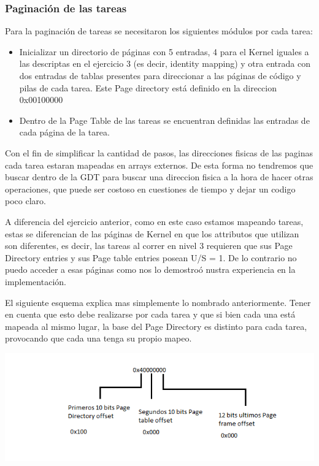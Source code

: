 \subsubsection{Paginaci\'on de las tareas}

Para la paginaci\'on de tareas se necesitaron los siguientes m\'odulos por cada tarea:
\begin{itemize}
 \item Inicializar un directorio de p\'aginas con 5 entradas, 4 para el Kernel iguales a las descriptas en el ejercicio 3 (es decir, identity mapping) 
 y otra entrada con dos entradas de tablas presentes para direccionar a las p\'aginas de c\'odigo y pilas de cada tarea. Este Page directory est\'a definido en la direccion 0x00100000
 \item Dentro de la Page Table de las tareas se encuentran definidas las entradas de cada p\'agina de la tarea. 
\end{itemize}

Con el fin de simplificar la cantidad de pasos, las direcciones fisicas de las paginas cada tarea estaran mapeadas en arrays externos. De esta forma no
tendremos que buscar dentro de la GDT para buscar una direccion fisica a la hora de hacer otras operaciones, que puede ser costoso en cuestiones de tiempo
y dejar un codigo poco claro.

A diferencia del ejercicio anterior, como en este caso estamos mapeando tareas, estas se diferencian de las p\'aginas de Kernel en que
los attributos que utilizan son diferentes, es decir, las tareas al correr en nivel 3 requieren que sus Page Directory entries y sus
Page table entries posean U/S = 1. De lo contrario no puedo acceder a esas p\'aginas como nos lo demostro\'o nustra experiencia en la
implementaci\'on.

El siguiente esquema explica mas simplemente lo nombrado anteriormente. Tener en cuenta que esto debe realizarse por cada tarea y que si
bien cada una est\'a mapeada al mismo lugar, la base del Page Directory es distinto para cada tarea, provocando que cada una tenga su
propio mapeo. %

\begin{center}
  \includegraphics[scale=0.6]{imagenes/ComoDividoVirtual.png} 
\end{center}

